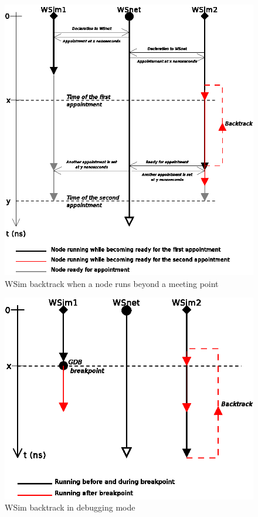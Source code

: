\documentclass[a4paper,10pt]{report}
\begin{document}
\begin{figure}
\begin{center}
  \includegraphics[scale=1]{figures/wsim_backtrack1.eps}
\end{center}
\caption{WSim backtrack when a node runs beyond a meeting point}
\label{wsim backtrack 1}
\end{figure}

\begin{figure}
\begin{center}
  \includegraphics[scale=1]{figures/wsim_backtrack2.eps}
\end{center}
\caption{WSim backtrack in debugging mode}
\label{wsim backtrack 2}
\end{figure}
\end{document}
